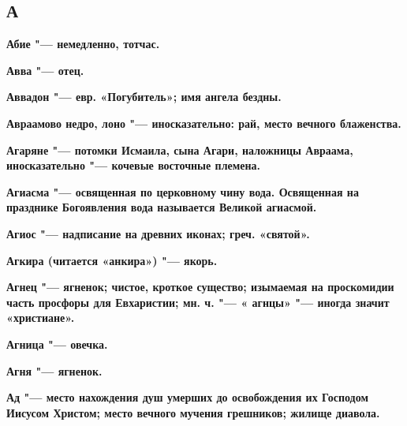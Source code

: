 

 
\begin{multicols}{2}\footnotesize

\section{А}


\bfseries Абие\normalfont{} "--- немедленно, тотчас. 




\bfseries Авва\normalfont{} "--- отец. 




\bfseries Аввадон\normalfont{} "--- евр. «Погубитель»; имя ангела бездны. 




\bfseries Авраамово недро, лоно\normalfont{} "--- иносказательно: рай, место вечного блаженства. 




\bfseries Агаряне\normalfont{} "--- потомки Исмаила, сына Агари, наложницы Авраама, иносказательно "--- кочевые восточные племена. 




\bfseries Агиасма\normalfont{} "--- освященная по церковному чину вода. Освященная на празднике Богоявления вода называется Великой агиасмой. 




\bfseries Агиос\normalfont{} "--- надписание на древних иконах; греч. «святой». 




\bfseries Агкира\normalfont{} (читается «анкира») "--- якорь. 




\bfseries Агнец\normalfont{} "--- ягненок; чистое, кроткое существо; изымаемая на проскомидии часть просфоры для Евхаристии; мн. ч. "--- « \bfseries агнцы\normalfont{}» "--- иногда значит «христиане». 




\bfseries Агница\normalfont{} "--- овечка. 




\bfseries Агня\normalfont{} "--- ягненок. 




\bfseries Ад\normalfont{} "--- место нахождения душ умерших до освобождения их Господом Иисусом Христом; место вечного мучения грешников; жилище диавола. 





\end{multicols}
